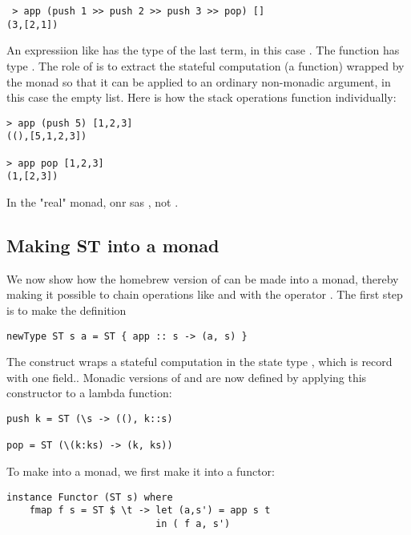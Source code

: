 \begin{verbatim}
 > app (push 1 >> push 2 >> push 3 >> pop) []
(3,[2,1])
\end{verbatim}

An expressiion like  has the type of the last term, in this case . The function  has type .   The role of  is to extract the stateful computation (a function) wrapped by the monad so that it can be applied to an ordinary non-monadic argument, in this case the empty list.  Here is how the stack operations function individually:

\begin{verbatim}
> app (push 5) [1,2,3]
((),[5,1,2,3])

> app pop [1,2,3]
(1,[2,3])
\end{verbatim}

 In the "real"  monad, onr sas , not .

\subsection{Making ST into a monad}


We now show how the homebrew version of  can be made into a monad, thereby making it possible to chain operations like  and  with the operator \code{>>}.  The first step is to make the definition

\begin{verbatim}
newType ST s a = ST { app :: s -> (a, s) }
\end{verbatim}

The construct   wraps a stateful computation in the state type , which is record with one field..  Monadic versions of  and   are now defined by applying this  constructor to a lambda function:

\begin{verbatim}
push k = ST (\s -> ((), k::s)

pop = ST (\(k:ks) -> (k, ks))
\end{verbatim}

To make  into a monad, we first make it into a functor:

\begin{verbatim}
instance Functor (ST s) where
    fmap f s = ST $ \t -> let (a,s') = app s t
                          in ( f a, s')
\end{verbatim}

